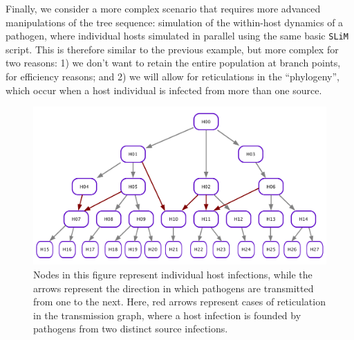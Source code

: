 \documentclass[12pt]{article}
\newcommand{\slim}[0]{\texttt{SLiM}\xspace}
\begin{document}
Finally, we consider a more complex scenario that requires more advanced manipulations of the tree sequence:
simulation of the within-host dynamics of a pathogen,
where individual hosts simulated in parallel using the same basic \slim script.
This is therefore similar to the previous example, but more complex for two reasons:
1) we don't want to retain the entire population at branch points, for efficiency reasons; and
2) we will allow for reticulations in the ``phylogeny'',
which occur when a host individual is infected from more than one source.



\begin{figure}[h!]
    \centering
     \includegraphics[width=\textwidth]{figures/DAG_w_reticulation.pdf}
     \caption{
        Nodes in this figure represent individual host infections, while the arrows represent the direction in which pathogens are transmitted from one to the next. Here, red arrows represent cases of reticulation in the transmission graph, where a host infection is founded by pathogens from two distinct source infections.
     \label{fig:DAG_w_reticulation}
     }
    \end{figure}
\end{document}
